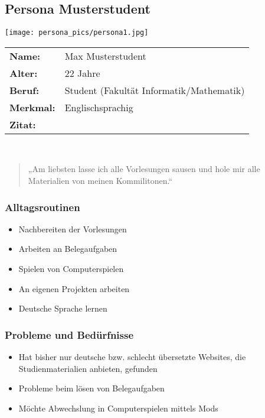 \subsection{Persona Musterstudent}
\begin{minipage}[t][][b]{.25\textwidth}
\texttt{[image: persona\_pics/persona1.jpg]}\end{minipage}\hfill
%
\begin{minipage}[t][][b]{.72\textwidth}
\noindent%
\begin{tabular}{L{.25} L{.7}}
\textbf{Name:} & Max Musterstudent \\
\textbf{Alter:} & 22 Jahre\\
\textbf{Beruf:} & Student (Fakultät Informatik/Mathematik)\\
\textbf{Merkmal:} & Englischsprachig \\
\textbf{Zitat:} & \\
\end{tabular}\\
\begin{quote}
„Am liebsten lasse ich alle Vorlesungen sausen und hole mir alle Materialien von meinen Kommilitonen.“
\end{quote}
\end{minipage}\vspace*{1em}

\begin{minipage}[t][][b]{.48\textwidth}
\subsubsection*{Alltagsroutinen}%
\begin{itemize}[leftmargin=*]
\item Nachbereiten der Vorlesungen
\item Arbeiten an Belegaufgaben
\item Spielen von Computerspielen
\item An eigenen Projekten arbeiten
\item Deutsche Sprache lernen
\end{itemize}
\end{minipage}\hfill
%
\begin{minipage}[t]{.48\textwidth}
\subsubsection*{Probleme und Bedürfnisse}%
\begin{itemize}[leftmargin=*]
\item Hat bisher nur deutsche bzw. schlecht übersetzte Websites, die Studienmaterialien anbieten, gefunden
\item Probleme beim lösen von Belegaufgaben
\item Möchte Abwechslung in Computerspielen mittels Mods
\end{itemize}
\end{minipage}\bigskip

